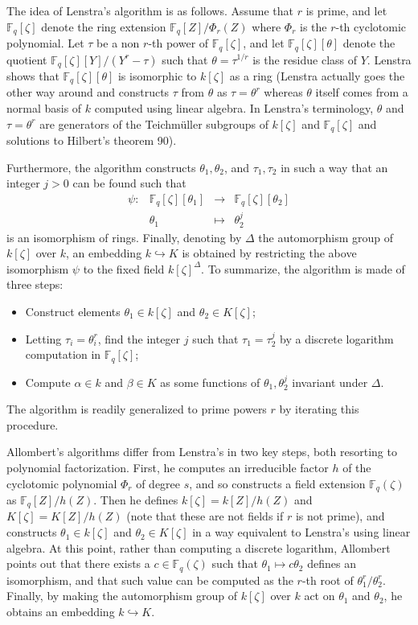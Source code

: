 \documentclass{mcom-l}
\theoremstyle{plain}
\theoremstyle{definition}
\newcommand{\F}{\ensuremath{\mathbb{F}}}
\newcounter{algorithm}
\begin{document}
The idea of Lenstra's algorithm is as follows.  Assume that $r$ is
prime, and let $\F_q[\zeta]$ denote the ring extension $\F_q[Z] /
\Phi_r(Z)$ where $\Phi_r$ is the $r$-th cyclotomic polynomial.  Let
$\tau$ be a non $r$-th power of $\F_q[\zeta]$, and let
$\F_q[\zeta][\theta]$ denote the quotient $\F_q[\zeta][Y]/(Y^r -
\tau)$ such that $\theta=\tau^{1/r}$ is the residue class of $Y$.
Lenstra shows that $\F_q[\zeta][\theta]$ is isomorphic to $k[\zeta]$
as a ring (Lenstra actually goes the other way around and constructs
$\tau$ from $\theta$ as $\tau = \theta^r$ whereas $\theta$ itself
comes from a normal basis of $k$ computed using linear algebra.  In
Lenstra's terminology, $\theta$ and $\tau=\theta^r$ are generators of
the Teichm\"uller subgroups of $k[\zeta]$ and $\F_q[\zeta]$ and
solutions to Hilbert's theorem 90).

Furthermore, the algorithm constructs $\theta_1, \theta_2$, and
$\tau_1, \tau_2$ in such a way that an integer $j > 0$ can be found
such that
\[
\begin{array}{lrll}
\psi: & \F_q[\zeta][\theta_1] & \rightarrow & \F_q[\zeta][\theta_2] \\
& \theta_1 & \mapsto & \theta_2^j
\end{array}
\]
is an isomorphism of rings.
Finally, denoting by $\Delta$ the automorphism group of $k[\zeta]$
over $k$, an embedding $k \hookrightarrow K$ is obtained by
restricting the above isomorphism $\psi$ to the fixed field
$k[\zeta]^\Delta$.
To summarize, the algorithm is made of three steps:
\begin{itemize}
\item Construct elements $\theta_1\in k[\zeta]$ and $\theta_2\in K[\zeta]$;
\item Letting $\tau_i=\theta_i^r$, find the integer $j$ such that
  $\tau_1=\tau_2^j$ by a discrete logarithm computation in
  $\F_q[\zeta]$;
\item Compute $\alpha\in k$ and $\beta\in K$ as some functions of
  $\theta_1,\theta_2^j$ invariant under $\Delta$.
\end{itemize}
The algorithm is readily generalized to prime powers $r$ by iterating
this procedure.

Allombert's algorithms differ from Lenstra's in two key steps, both
resorting to polynomial factorization.
First, he computes an irreducible factor $h$ of the cyclotomic
polynomial $\Phi_r$ of degree $s$,
and so constructs a field extension $\F_q(\zeta)$ as $\F_q[Z]/h(Z)$.
Then he defines $k[\zeta]=k[Z]/h(Z)$ and $K[\zeta]=K[Z]/h(Z)$
(note that these are not fields if $r$ is not prime), and constructs
$\theta_1\in k[\zeta]$ and $\theta_2\in K[\zeta]$ in a way equivalent
to Lenstra's using linear algebra. 
At this point, rather than computing a discrete
logarithm, Allombert points out that there exists a $c\in\F_q(\zeta)$
such that $\theta_1\mapsto c\theta_2$ defines an isomorphism,
and that such value can be
computed as the $r$-th root of $\theta_1^r/\theta_2^r$.
Finally, by making the automorphism group of $k[\zeta]$ over $k$ act
on $\theta_1$ and $\theta_2$, he obtains an embedding $k \hookrightarrow K$.%
\end{document}
